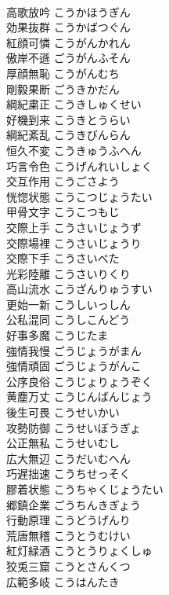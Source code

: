 \documentclass[8pt]{extreport}
\begin{document}
\begin{CJK}{UTF8}{min}
\\	高歌放吟	こうかほうぎん	
\\	効果抜群	こうかばつぐん	
\\	紅顔可憐	こうがんかれん	
\\	傲岸不遜	ごうがんふそん	
\\	厚顔無恥	こうがんむち	
\\	剛毅果断	ごうきかだん	
\\	綱紀粛正	こうきしゅくせい	
\\	好機到来	こうきとうらい	
\\	綱紀紊乱	こうきびんらん	
\\	恒久不変	こうきゅうふへん	
\\	巧言令色	こうげんれいしょく	
\\	交互作用	こうごさよう	
\\	恍惚状態	こうこつじょうたい	
\\	甲骨文字	こうこつもじ	
\\	交際上手	こうさいじょうず	
\\	交際場裡	こうさいじょうり	
\\	交際下手	こうさいべた	
\\	光彩陸離	こうさいりくり	
\\	高山流水	こうざんりゅうすい	
\\	更始一新	こうしいっしん	
\\	公私混同	こうしこんどう	
\\	好事多魔	こうじたま	
\\	強情我慢	ごうじょうがまん	
\\	強情頑固	ごうじょうがんこ	
\\	公序良俗	こうじょりょうぞく	
\\	黄塵万丈	こうじんばんじょう	
\\	後生可畏	こうせいかい	
\\	攻勢防御	こうせいぼうぎょ	
\\	公正無私	こうせいむし	
\\	広大無辺	こうだいむへん	
\\	巧遅拙速	こうちせっそく	
\\	膠着状態	こうちゃくじょうたい	
\\	郷鎮企業	ごうちんきぎょう	
\\	行動原理	こうどうげんり	
\\	荒唐無稽	こうとうむけい	
\\	紅灯緑酒	こうとうりょくしゅ	
\\	狡兎三窟	こうとさんくつ	
\\	広範多岐	こうはんたき	

\end{CJK}
\end{document}
